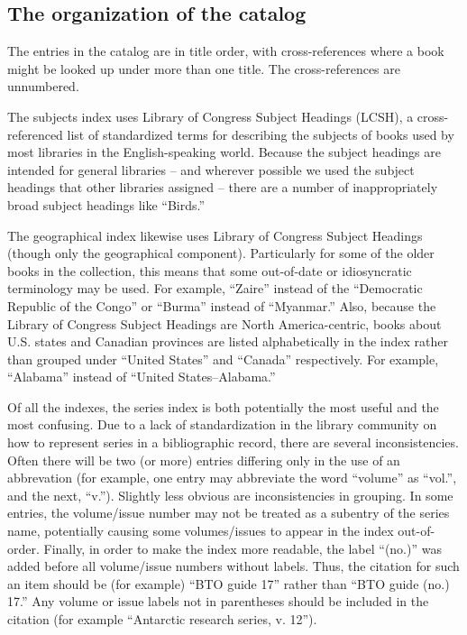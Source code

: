 \subsection*{The organization of the catalog}

The entries in the catalog are in title order, with cross-references where a
book might be looked up under more than one title. The cross-references are
unnumbered.

The subjects index uses Library of Congress Subject Headings (LCSH), a
cross-referenced list of standardized terms for describing the subjects of books
used by most libraries in the English-speaking world. Because the subject headings
are intended for general libraries -- and wherever possible we used the subject
headings that other libraries assigned -- there are a number of inappropriately
broad subject headings like ``Birds.''

The geographical index likewise uses Library of Congress Subject Headings (though
only the geographical component). Particularly for some of the older books in
the collection, this means that some out-of-date or idiosyncratic terminology
may be used. For example, ``Zaire'' instead of the ``Democratic Republic of the
Congo'' or ``Burma'' instead of ``Myanmar.'' Also, because the Library of Congress
Subject Headings are North America-centric, books about U.S. states and Canadian
provinces are listed alphabetically in the index rather than grouped under
``United States'' and ``Canada'' respectively. For example, ``Alabama'' instead
of ``United States--Alabama.''

Of all the indexes, the series index is both potentially the most useful and
the most confusing. Due to a lack of standardization in the library community
on how to represent series in a bibliographic record, there are several
inconsistencies. Often there will be two (or more) entries differing only in
the use of an abbrevation (for example, one entry may abbreviate the word
``volume'' as ``vol.'', and the next, ``v.''). Slightly less obvious are
inconsistencies in grouping. In some entries, the volume/issue number may not
be treated as a subentry of the series name, potentially causing some
volumes/issues to appear in the index out-of-order.  Finally, in order to make
the index more readable, the label ``(no.)'' was added before all volume/issue
numbers without labels. Thus, the citation for such an item should be (for
example) ``BTO guide 17'' rather than ``BTO guide (no.) 17.'' Any volume or issue
labels not in parentheses should be included in the citation (for example
``Antarctic research series, v. 12'').


